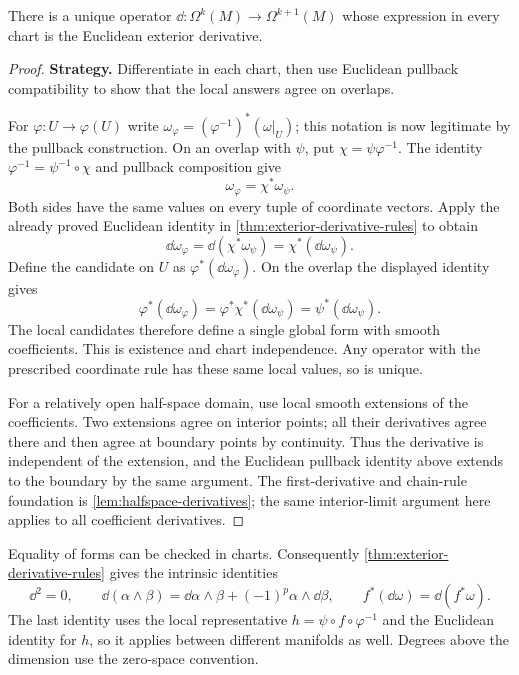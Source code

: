 \begin{proposition}\label{prop:manifold-exterior-derivative}
There is a unique operator $\dd:\Omega^k(M)\to\Omega^{k+1}(M)$ whose
expression in every chart is the Euclidean exterior derivative.
\end{proposition}
\begin{proof}
\textbf{Strategy.} Differentiate in each chart, then use Euclidean pullback
compatibility to show that the local answers agree on overlaps.

For $\varphi:U\to\varphi(U)$ write
$\omega_\varphi=(\varphi^{-1})^*(\omega|_U)$; this notation is now
legitimate by the pullback construction. On an overlap with $\psi$, put
$\chi=\psi\varphi^{-1}$. The identity
$\varphi^{-1}=\psi^{-1}\circ\chi$ and pullback composition give
\[
\omega_\varphi=\chi^*\omega_\psi.
\]
Both sides have the same values on every tuple of coordinate vectors.
Apply the already proved Euclidean identity in
\cref{thm:exterior-derivative-rules} to obtain
\[
\dd\omega_\varphi
=\dd(\chi^*\omega_\psi)=\chi^*(\dd\omega_\psi).
\]
Define the candidate on $U$ as $\varphi^*(\dd\omega_\varphi)$.
On the overlap the displayed identity gives
\[
\varphi^*(\dd\omega_\varphi)
=\varphi^*\chi^*(\dd\omega_\psi)
=\psi^*(\dd\omega_\psi).
\]
The local candidates therefore define a single global form with smooth
coefficients. This is existence and chart independence. Any operator with
the prescribed coordinate rule has these same local values, so is unique.

For a relatively open half-space domain, use local smooth extensions of
the coefficients. Two extensions agree on interior points; all their
derivatives agree there and then agree at boundary points by continuity.
Thus the derivative is independent of the extension, and the Euclidean
pullback identity above extends to the boundary by the same argument.
The first-derivative and chain-rule foundation is \cref{lem:halfspace-derivatives}; the same interior-limit argument here applies to all coefficient derivatives.
\end{proof}
Equality of forms can be checked in charts. Consequently
\cref{thm:exterior-derivative-rules} gives the intrinsic identities
\[
\dd^2=0,\qquad
\dd(\alpha\wedge\beta)=\dd\alpha\wedge\beta+(-1)^p\alpha\wedge\dd\beta,
\qquad f^*(\dd\omega)=\dd(f^*\omega).
\]
The last identity uses the local representative $h=\psi\circ f\circ\varphi^{-1}$
and the Euclidean identity for $h$, so it applies between different
manifolds as well. Degrees above the dimension use the zero-space convention.

